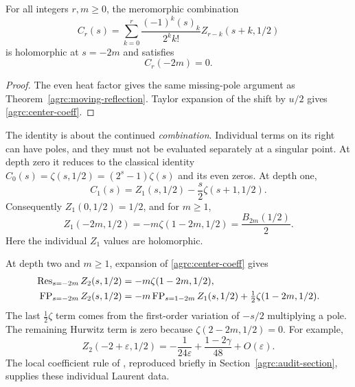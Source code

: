 \begin{corollary}
\label{agrc:center-zeros}
For all integers $r,m\geq0$, the meromorphic combination
\begin{equation}\label{agrc:center-coeff}
 \boxed{\displaystyle
 C_r(s)=\sum_{k=0}^r\frac{(-1)^k(s)_k}{2^k k!}
                               Z_{r-k}(s+k,1/2)}
\end{equation}
is holomorphic at $s=-2m$ and satisfies
\begin{equation}\label{agrc:center-zero}
 \boxed{C_r(-2m)=0.}
\end{equation}
\end{corollary}
\begin{proof}
The even heat factor gives the same missing-pole argument as
Theorem~\ref{agrc:moving-reflection}. Taylor expansion of the shift by
$u/2$ gives \eqref{agrc:center-coeff}.
\end{proof}

The identity is about the continued \emph{combination}. Individual terms
on its right can have poles, and they must not be evaluated separately
at a singular point. At depth zero it reduces to the classical identity
$C_0(s)=\zeta(s,1/2)=(2^s-1)\zeta(s)$ and its even zeros.
At depth one,
\begin{equation}\label{agrc:C1}
 C_1(s)=Z_1(s,1/2)-\frac{s}{2}\zeta(s+1,1/2).
\end{equation}
Consequently $Z_1(0,1/2)=1/2$, and for $m\geq1$,
\begin{equation}\label{agrc:Z1-negative-even}
 Z_1(-2m,1/2)=-m\zeta(1-2m,1/2)=\frac{B_{2m}(1/2)}2.
\end{equation}
Here the individual $Z_1$ values are holomorphic.

At depth two and $m\geq1$, expansion of \eqref{agrc:center-coeff} gives
\begin{align}
 \operatorname{Res}_{s=-2m}Z_2(s,1/2)&=-m\zeta(1-2m,1/2),\label{agrc:Z2-residue}\\
 \operatorname{FP}_{s=-2m}Z_2(s,1/2)
 &=-m\operatorname{FP}_{s=1-2m}Z_1(s,1/2)
                         +\tfrac12\zeta(1-2m,1/2).
 \label{agrc:Z2-fp}
\end{align}
The last $\tfrac12\zeta$ term comes from the first-order variation of
$-s/2$ multiplying a pole. The remaining Hurwitz term is zero because
$\zeta(2-2m,1/2)=0$. For example,
\begin{equation}\label{agrc:Z2-example}
 Z_2(-2+\varepsilon,1/2)
      =-\frac1{24\varepsilon}+\frac{1-2\gamma}{48}+O(\varepsilon).
\end{equation}
The local coefficient rule of \cite{repo-laurent}, reproduced briefly in
Section~\ref{agrc:audit-section}, supplies these individual Laurent data.

